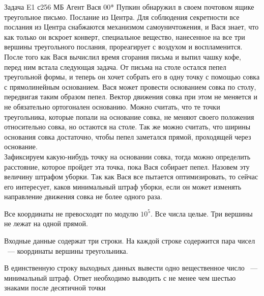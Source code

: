 \begin{problem}{Задача E}{1 с}{256 МБ}
Агент Вася 00* Пупкин  обнаружил в своем почтовом ящике треугольное
письмо. Послание из Центра. Для соблюдения секретности все послания из Центра
снабжаются механизмом самоуничтожения, и Вася знает, что как только он вскроет
конверт, специальное вещество, нанесенное на все три вершины треугольного
послания, прореагирует с воздухом и воспламенится.\\
После того как Вася вычислил время сгорания письма и выпил чашку кофе,
перед ним встала следующая задача. От письма на столе остался
пепел треугольной формы, и теперь он хочет собрать его в одну точку
с помощью совка с прямолинейным основанием. Вася может провести
основанием совка по столу, передвигая таким образом пепел.
Вектор движения совка при этом не меняется и не обязательно ортогонален
основанию. Можно считать, что те точки треугольника, которые попали на
основание совка, не меняют своего положения относительно совка, но остаются
на столе. Так же можно считать, что ширины основания совка достаточно,
чтобы пепел заметался прямой, проходящей через основание.\\
Зафиксируем какую-нибудь точку на основании совка, тогда можно
определить расстояние, которое пройдет эта точка, пока Вася собирает пепел.
Назовем эту величину штрафом уборки.
Так как Вася все пытается оптимизировать, то сейчас его интересует, каков
минимальный штраф уборки, если он может изменять направление
движения совка не более одного раза.

\Limit

Все координаты не превосходят по модулю $10^5$.
Все числа целые.
Три вершины не лежат на одной прямой.

\InputFile
Входные данные содержат три строки. На каждой строке содержится пара чисел
~--- координаты вершины треугольника.

\OutputFile
В единственную строку выходных данных вывести одно вещественное число ~---
минимальный штраф. Ответ необходимо
выводить с не менее чем шестью знаками после десятичной точки

\Example
\begin{example}
\end{example}
\end{problem}
